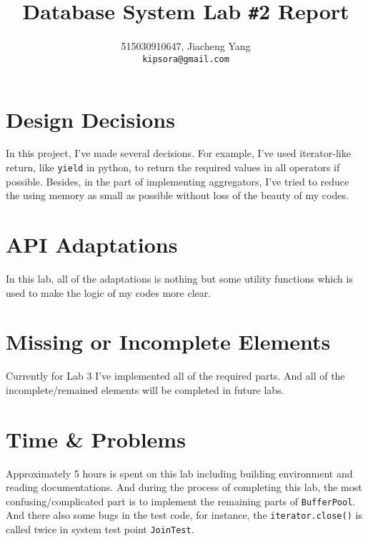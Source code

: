 \documentclass{article}
\title{Database System Lab \texttt{\#}2 Report}
\author{515030910647, Jiacheng Yang\\\texttt{kipsora@gmail.com}}
\begin{document}
    \maketitle
    \section{Design Decisions}
        In this project, I've made several decisions. For example, I've used iterator-like return, like \texttt{yield} in python, to return the required values in all operators if possible. Besides, in the part of implementing aggregators, I've tried to reduce the using memory as small as possible without loss of the beauty of my codes.

    \section{API Adaptations}
    	In this lab, all of the adaptations is nothing but some utility functions which is used to make the logic of my codes more clear.

    \section{Missing or Incomplete Elements}
        Currently for Lab 3 I've implemented all of the required parts. And all of the incomplete/remained elements will be completed in future labs.

    \section{Time \& Problems}
        Approximately 5 hours is spent on this lab including building environment and reading documentations. And during the process of completing this lab, the most confusing/complicated part is to implement the remaining parts of \texttt{BufferPool}. And there also some bugs in the test code, for instance, the \texttt{iterator.close()} is called twice in system test point \texttt{JoinTest}.
\end{document}
